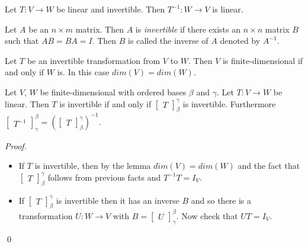 \documentclass[12pt]{article}
\newenvironment{lemma}[2][Lemma]{\begin{trivlist}
\item[\hskip \labelsep {\bfseries #1}\hskip \labelsep {\bfseries #2.}]}{\end{trivlist}}
\newenvironment{theorem}[2][Theorem]{\begin{trivlist}
\item[\hskip \labelsep {\bfseries #1}\hskip \labelsep {\bfseries #2.}]}{\end{trivlist}}
\newenvironment{definition}[2][Definition]{\begin{trivlist}
\item[\hskip \labelsep {\bfseries #1}\hskip \labelsep {\bfseries #2}]}{\end{trivlist}}
\newenvironment{sol}
    {\emph{Proof.}
    }
    {
    \qed
    }
\begin{document}
\begin{theorem}{2.17}
Let $T : V \to W$ be linear and invertible. Then $T^{-1} : W \to V$ is linear.
\end{theorem}

\begin{definition}{7}
Let $A$ be an $n \times m$ matrix. Then $A$ is \textit{invertible} if there exists an $n \times n$ matrix $B$ such that $AB = BA = I$. Then $B$ is called the inverse of $A$ denoted by $A^{-1}$.
\end{definition}

\begin{lemma}{19}
Let $T$ be an invertible transformation from $V$ to $W$. Then $V$ is finite-dimensional if and only if $W$ is. In this case $dim(V) = dim(W)$. 
\end{lemma}

\begin{theorem}{2.18}
Let $V$, $W$ be finite-dimensional with ordered bases $\beta$ and $\gamma$. Let $T : V \to W$ be linear. Then $T$ is invertible if and only if $\begin{bmatrix} T \end{bmatrix}_\beta^\gamma$ is invertible. Furthermore $\begin{bmatrix} T^{-1} \end{bmatrix}_\gamma^\beta = (\begin{bmatrix} T \end{bmatrix}_\beta^\gamma)^{-1}$.
\end{theorem}

\begin{sol}
\begin{itemize}
    \item If $T$ is invertible, then by the lemma $dim(V) = dim(W)$ and the fact that $\begin{bmatrix} T \end{bmatrix}_\beta^\gamma$ follows from previous facts and $T^{-1}T = I_V$.
    
    \item If $\begin{bmatrix} T \end{bmatrix}_\beta^\gamma$ is invertible then it has an inverse $B$ and so there is a transformation $U : W \to V$ with $B = \begin{bmatrix} U \end{bmatrix}_\gamma^\beta$. Now check that $UT = I_V$. 
\end{itemize}
\end{sol}
\end{document}
